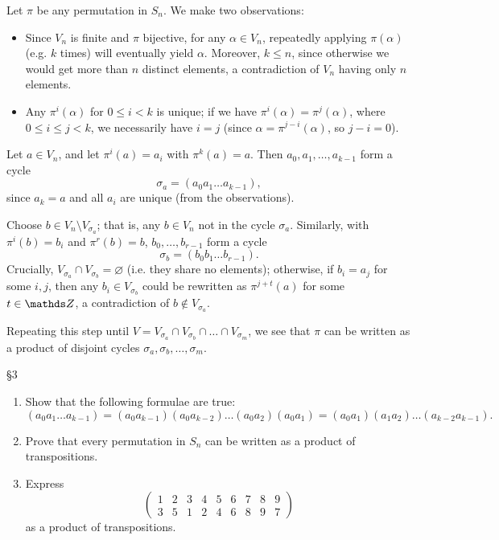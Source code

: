 \documentclass{homework}
\begin{document}
\begin{solution}
  Let $\pi$ be any permutation in $S_n$. We make two observations:
  \begin{itemize}
    \item Since $V_n$ is finite and $\pi$ bijective, for any $\alpha\in V_n$, repeatedly applying
      $\pi(\alpha)$ (e.g. $k$ times) will eventually yield $\alpha$. Moreover, $k\le n$, since
      otherwise we would get more than $n$ distinct elements, a contradiction of $V_n$ having only
      $n$ elements.
    \item Any $\pi^{i}(\alpha)$ for $0\le i<k$ is unique; if we have
      $\pi^{i}(\alpha)=\pi^{j}(\alpha)$, where $0\le i\le j<k$, we necessarily have $i=j$ (since
      $\alpha=\pi^{j-i}(\alpha)$, so $j-i=0$).
  \end{itemize}

  Let $a\in V_n$, and let $\pi^{i}(a)=a_i$ with $\pi^{k}(a)=a$. Then $  a_0,a_1,\ldots,a_{k-1}$ form
  a cycle  \[
    \sigma_a=(a_0a_1\ldots a_{k-1})
  ,\] since $a_k=a$ and all $a_i$ are unique (from the observations).

  Choose $b\in V_n\setminus V_{\sigma_a}$; that is, any $b\in V_n$ not in the cycle $\sigma_a$.
  Similarly, with $\pi^{i}(b)=b_i$ and $\pi^{r}(b)=b$, $  b_0,\ldots,b_{r-1}$ form a cycle \[
    \sigma_b = (b_0b_1\ldots b_{r-1})
  .\] Crucially, $V_{\sigma_a}\cap V_{\sigma_b}=\varnothing$ (i.e. they share no elements);
  otherwise, if $b_i=a_j$ for some $i,j$, then any $b_i\in V_{\sigma_b}$ could be rewritten as
  $\pi^{j+t}(a)$ for some $t\in \Z$, a contradiction of $b\not\in V_{\sigma_a}$.

  Repeating this step until $V=V_{\sigma_a}\cap V_{\sigma_b}\cap \ldots\cap V_{\sigma_m}$, we see
  that $\pi$ can be written as a product of disjoint cycles $\sigma_a, \sigma_b, \ldots, \sigma_m$.
\end{solution}

\begin{problem}{\S 3}
  \begin{enumerate}[label=(\alph*)]
    \item Show that the following formulae are true: \[
        (a_0a_1\ldots
          a_{k-1})=(a_0a_{k-1})(a_0a_{k-2})\ldots(a_0a_2)(a_0a_1)=(a_0a_1)(a_1a_2)\ldots(a_{k-2}a_{k-1})
      .\] 
    \item Prove that every permutation in $S_n$ can be written as a product of transpositions.
    \item Express \[
        \begin{pmatrix} 1&2&3&4&5&6&7&8&9\\3&5&1&2&4&6&8&9&7 \end{pmatrix}
    \] as a product of transpositions.
  \end{enumerate}
\end{problem}
\end{document}
